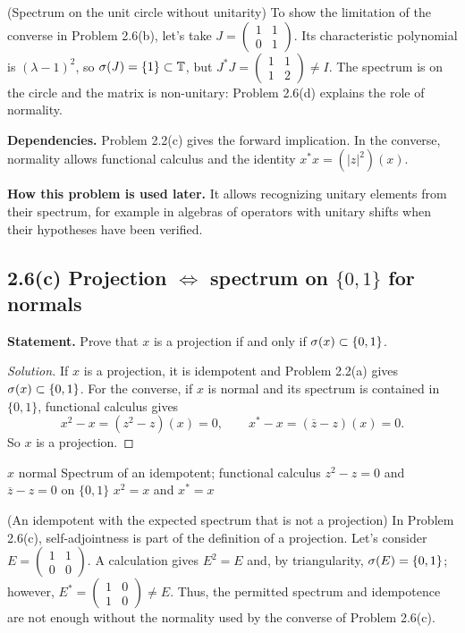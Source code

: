 \begin{cthejemplo}{(Spectrum on the unit circle without unitarity)}
To show the limitation of the converse in Problem 2.6(b), let's take
$J=\begin{pmatrix}1&1\\0&1\end{pmatrix}$.
Its characteristic polynomial is $(\lambda-1)^2$, so
$\sigma(J)=\{1\}\subset\mathbb T$, but
$J^*J=\begin{pmatrix}1&1\\1&2\end{pmatrix}\ne I$.
The spectrum is on the circle and the matrix is non-unitary: Problem 2.6(d) explains the role of normality.
\end{cthejemplo}

\noindent\textbf{Dependencies.} Problem 2.2(c) gives the forward implication. In the converse, normality allows functional calculus and the identity $x^*x=(|z|^2)(x)$.

\noindent\textbf{How this problem is used later.} It allows recognizing unitary elements from their spectrum, for example in algebras of operators with unitary shifts when their hypotheses have been verified.

\subsection*{2.6(c) Projection $\Longleftrightarrow$ spectrum on $\{0,1\}$ for normals}

\noindent\textbf{Statement.} Prove that $x$ is a projection if and only if $\sigma(x)\subset\{0,1\}$.

\begin{proof}[Solution]
If $x$ is a projection, it is idempotent and Problem 2.2(a) gives
$\sigma(x)\subset\{0,1\}$. For the converse, if $x$ is normal and its spectrum is contained in
$\{0,1\}$, functional calculus gives
\[
 x^2-x=(z^2-z)(x)=0,
 \qquad
 x^*-x=(\overline z-z)(x)=0.
\]
So $x$ is a projection.
\end{proof}

\proofdiagram
{$x$ normal}
{Spectrum of an idempotent; functional calculus}
{$z^2-z=0$ and $\overline z-z=0$ on $\{0,1\}$}
{$x^2=x$ and $x^*=x$}

\begin{cthejemplo}{(An idempotent with the expected spectrum that is not a projection)}
In Problem 2.6(c), self-adjointness is part of the definition of a projection. Let's consider
$E=\begin{pmatrix}1&1\\0&0\end{pmatrix}$.
A calculation gives $E^2=E$ and, by triangularity, $\sigma(E)=\{0,1\}$; however,
$E^*=\begin{pmatrix}1&0\\1&0\end{pmatrix}\ne E$.
Thus, the permitted spectrum and idempotence are not enough without the normality used by the
converse of Problem 2.6(c).
\end{cthejemplo}

